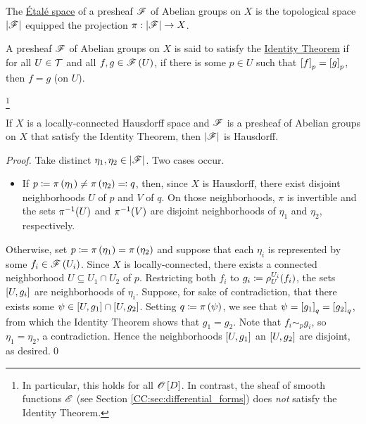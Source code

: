 \documentclass[../Moduli_Spaces_of_Riemann_Surfaces.tex]{subfiles}
\begin{document}
    \begin{definition}
        The \ul{Étalé space} of a presheaf $\mathscr{F}$ of Abelian groups on $X$ is the topological space $\left|\mathscr{F}\right|$ equipped the projection $\pi:\left|\mathscr{F}\right|\to X$.
    \end{definition}
    \begin{definition}
        A presheaf $\mathscr{F}$ of Abelian groups on $X$ is said to satisfy the \ul{Identity Theorem} if for all $U\in\mathcal{T}$ and all $f,g\in\mathscr{F}\left(U\right)$, if there is some $p\in U$ such that $\left[f\right]_p=\left[g\right]_p$, then $f=g$ (on $U$).
    \end{definition}
    \footnote{In particular, this holds for all $\mathscr{O}\left[D\right]$. In contrast, the sheaf of smooth functions $\mathscr{E}$ (see Section \ref{CC:sec:differential_forms}) does \textit{not} satisfy the Identity Theorem.}
    \begin{proposition}\label{A:prp:stalk_topology_Hausdorff}
        If $X$ is a locally-connected Hausdorff space and $\mathscr{F}$ is a presheaf of Abelian groups on $X$ that satisfy the Identity Theorem, then $\left|\mathscr{F}\right|$ is Hausdorff.
    \end{proposition}
    \begin{proof}
        Take distinct $\eta_1,\eta_2\in\left|\mathscr{F}\right|$. Two cases occur.
        \begin{itemize}
            \item If $p\coloneqq\pi\left(\eta_1\right)\neq\pi\left(\eta_2\right)\eqqcolon q$, then, since $X$ is Hausdorff, there exist disjoint neighborhoods $U$ of $p$ and $V$ of $q$. On those neighborhoods, $\pi$ is invertible and the sets $\pi^{-1}\!\left(U\right)$ and $\pi^{-1}\!\left(V\right)$ are disjoint neighborhoods of $\eta_1$ and $\eta_2$, respectively.
        \end{itemize}
        Otherwise, set $p\coloneqq\pi\left(\eta_1\right)=\pi\left(\eta_2\right)$ and suppose that each $\eta_i$ is represented by some $f_i\in\mathscr{F}\left(U_i\right)$. Since $X$ is locally-connected, there exists a connected neighborhood $U\subseteq U_1\cap U_2$ of $p$. Restricting both $f_i$ to $g_i\coloneqq\rho^{U_i}_U\!\left(f_i\right)$, the sets $\left[U,g_i\right]$ are neighborhoods of $\eta_i$. Suppose, for sake of contradiction, that there exists some $\psi\in\left[U,g_1\right]\cap\left[U,g_2\right]$. Setting $q\coloneqq\pi\left(\psi\right)$, we see that $\psi=\left[g_1\right]_q=\left[g_2\right]_q$, from which the Identity Theorem shows that $g_1=g_2$. Note that $f_i\sim_pg_i$, so $\eta_1=\eta_2$, a contradiction. Hence the neighborhoods $\left[U,g_1\right]$ an $\left[U,g_2\right]$ are disjoint, as desired.\qed
    \end{proof}
\end{document}
